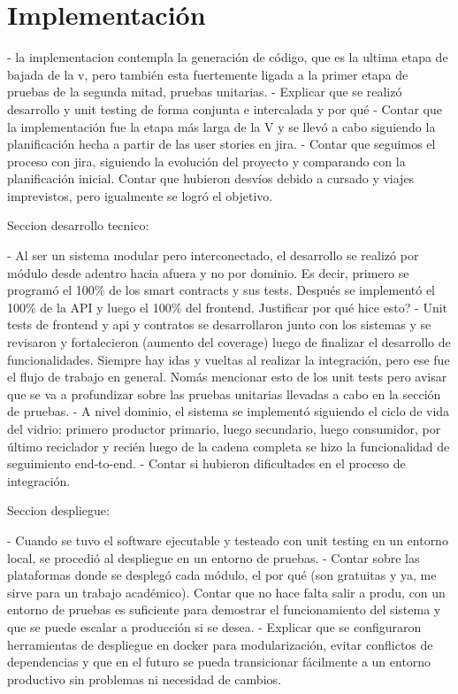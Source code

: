 \chapter[Implementación]{Implementación}
\label{cp:implementation}

\parindent0pt

- la implementacion contempla la generación de código, que es la ultima etapa de bajada de la v, pero también esta fuertemente ligada a la primer etapa de pruebas de la segunda mitad, pruebas unitarias.
- Explicar que se realizó desarrollo y unit testing de forma conjunta e intercalada y por qué
- Contar que la implementación fue la etapa más larga de la V y se llevó a cabo siguiendo la planificación hecha a partir de las user stories en jira.
- Contar que seguimos el proceso con jira, siguiendo la evolución del proyecto y comparando con la planificación inicial. Contar que hubieron desvíos debido a cursado y viajes imprevistos, pero igualmente se logró el objetivo.

Seccion desarrollo tecnico:

- Al ser un sistema modular pero interconectado, el desarrollo se realizó por módulo desde adentro hacia afuera y no por dominio. Es decir, primero se programó el 100\% de los smart contracts y sus tests. Después se implementó el 100\% de la API y luego el 100\% del frontend. Justificar por qué hice esto?
- Unit tests de frontend y api y contratos se desarrollaron junto con los sistemas y se revisaron y fortalecieron (aumento del coverage) luego de finalizar el desarrollo de funcionalidades. Siempre hay idas y vueltas al realizar la integración, pero ese fue el flujo de trabajo en general. Nomás mencionar esto de los unit tests pero avisar que se va a profundizar sobre las pruebas unitarias llevadas a cabo en la sección de pruebas.
- A nivel dominio, el sistema se implementó siguiendo el ciclo de vida del vidrio: primero productor primario, luego secundario, luego consumidor, por último reciclador y recién luego de la cadena completa se hizo la funcionalidad de seguimiento end-to-end.
- Contar si hubieron dificultades en el proceso de integración.

Seccion despliegue:

- Cuando se tuvo el software ejecutable y testeado con unit testing en un entorno local, se procedió al despliegue en un entorno de pruebas. 
- Contar sobre las plataformas donde se desplegó cada módulo, el por qué (son gratuitas y ya, me sirve para un trabajo académico). Contar que no hace falta salir a produ, con un entorno de pruebas es suficiente para demostrar el funcionamiento del sistema y que se puede escalar a producción si se desea.
- Explicar que se configuraron herramientas de despliegue en docker para modularización, evitar conflictos de dependencias y que en el futuro se pueda transicionar fácilmente a un entorno productivo sin problemas ni necesidad de cambios.

